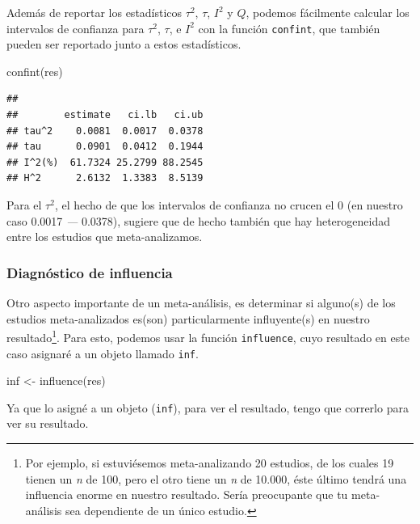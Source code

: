 \documentclass[
]{article}
\newenvironment{Shaded}{\begin{snugshade}}{\end{snugshade}}
\newcommand{\FunctionTok}[1]{\textcolor[rgb]{0.94,0.94,0.56}{#1}}
\newcommand{\NormalTok}[1]{\textcolor[rgb]{0.80,0.80,0.80}{#1}}
\newcommand{\OtherTok}[1]{\textcolor[rgb]{0.94,0.94,0.56}{#1}}
\begin{document}
Además de reportar los estadísticos \(\tau^2\), \(\tau\), \(I^2\) y
\(Q\), podemos fácilmente calcular los intervalos de confianza para
\(\tau^2\), \(\tau\), e \(I^2\) con la función \texttt{confint}, que
también pueden ser reportado junto a estos estadísticos.

\begin{Shaded}
\begin{Highlighting}[]
\FunctionTok{confint}\NormalTok{(res)}
\end{Highlighting}
\end{Shaded}

\begin{verbatim}
## 
##        estimate   ci.lb   ci.ub 
## tau^2    0.0081  0.0017  0.0378 
## tau      0.0901  0.0412  0.1944 
## I^2(%)  61.7324 25.2799 88.2545 
## H^2      2.6132  1.3383  8.5139
\end{verbatim}

Para el \(\tau^2\), el hecho de que los intervalos de confianza no
crucen el 0 (en nuestro caso 0.0017 \emph{---} 0.0378), sugiere que de
hecho también que hay heterogeneidad entre los estudios que
meta-analizamos.

\hypertarget{diagnuxf3stico-de-influencia}{%
\subsubsection{Diagnóstico de
influencia}\label{diagnuxf3stico-de-influencia}}

Otro aspecto importante de un meta-análisis, es determinar si alguno(s)
de los estudios meta-analizados es(son) particularmente influyente(s) en
nuestro resultado\footnote{Por ejemplo, si estuviésemos meta-analizando
  20 estudios, de los cuales 19 tienen un \emph{n} de 100, pero el otro
  tiene un \emph{n} de 10.000, éste último tendrá una influencia enorme
  en nuestro resultado. Sería preocupante que tu meta-análisis sea
  dependiente de un único estudio.}. Para esto, podemos usar la función
\texttt{influence}, cuyo resultado en este caso asignaré a un objeto
llamado \texttt{inf}.

\begin{Shaded}
\begin{Highlighting}[]
\NormalTok{inf }\OtherTok{\textless{}{-}} \FunctionTok{influence}\NormalTok{(res)}
\end{Highlighting}
\end{Shaded}

Ya que lo asigné a un objeto (\texttt{inf}), para ver el resultado,
tengo que correrlo para ver su resultado.
\end{document}
